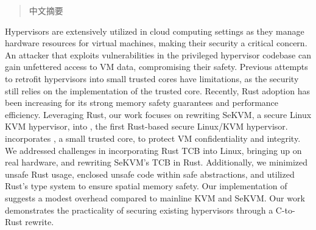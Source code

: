 
\begin{abstract}

中文摘要

\end{abstract}

\begin{abstract*}

Hypervisors are extensively utilized in cloud computing settings as they manage
hardware resources for virtual machines, making their security a critical
concern. An attacker that exploits vulnerabilities in the privileged hypervisor
codebase can gain unfettered access to VM data, compromising their safety.
Previous attempts to retrofit hypervisors into small trusted cores have
limitations, as the security still relies on the implementation of the trusted
core. Recently, Rust adoption has been increasing for its strong memory safety
guarantees and performance efficiency. Leveraging Rust, our work focuses on
rewriting SeKVM, a secure Linux KVM hypervisor, into \rustsec{}, the first
Rust-based secure Linux/KVM hypervisor. \rustsec{} incorporates
\rustcore{}, a small trusted core, to protect VM confidentiality and integrity.
We addressed challenges in incorporating Rust TCB into Linux, bringing up
\rustsec{} on real hardware, and rewriting SeKVM's TCB in Rust. Additionally,
we minimized unsafe Rust usage, enclosed unsafe code within safe abstractions,
and utilized Rust's type system to ensure spatial memory safety.
Our implementation of \rustsec{} suggests a modest overhead compared to
mainline KVM and SeKVM. Our work demonstrates the practicality of securing
existing hypervisors through a C-to-Rust rewrite.

\end{abstract*}
